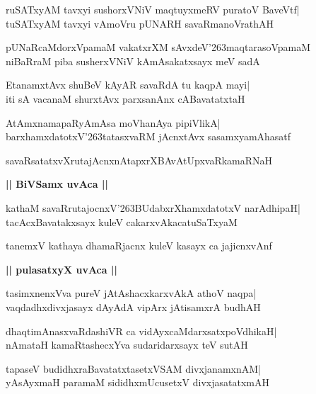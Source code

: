 \documentclass[twoside,12pt,openright]{book}
\def\S{\char'263}
\newcounter{shloka}[chapter]
\def\uvaca#1{\centerline{{\large\textbf{#1}}}}
\begin{document}
\begin{shloka}%
ruSATxyAM tavxyi sushorxVNiV maqtuyxmeRV puratoV BaveVtf|\\
tuSATxyAM tavxyi vAmoVru pUNARH savaRmanoVrathAH 
\end{shloka}

\begin{shloka}%
pUNaRcaMdorxVpamaM vakatxrXM sAvxdeV\S maqtarasoVpamaM\\
niBaRraM piba susherxVNiV kAmAsakatxsayx meV sadA
\end{shloka}

\begin{shloka}%
EtanamxtAvx shuBeV kAyAR savaRdA tu kaqpA mayi|\\
iti sA vacanaM shurxtAvx parxsanAnx cABavatatxtaH
\end{shloka}

\begin{shloka}%
AtAmxnamapaRyAmAsa moVhanAya pipiVlikA|\\
barxhamxdatotxV\S tatasxvaRM jAcnxtAvx sasamxyamAhasatf
\end{shloka}

\begin{shloka}%
savaRsatatxvXrutajAcnxnAtapxrXBAvAtUpxvaRkamaRNaH
\end{shloka}

\uvaca{|| BiVSamx uvAca ||}
\begin{shloka}%
kathaM savaRrutajocnxV\S BUdabxrXhamxdatotxV narAdhipaH|\\
tacAcxBavatakxsayx kuleV cakarxvAkacatuSaTxyaM
\end{shloka}

\begin{shloka}%
tanemxV kathaya dhamaRjacnx kuleV kasayx ca jajicnxvAnf
\end{shloka}

\uvaca{|| pulasatxyX uvAca ||}
\begin{shloka}%
tasimxnenxVva pureV jAtAshacxkarxvAkA athoV naqpa|\\
vaqdadhxdivxjasayx dAyAdA vipArx jAtisamxrA budhAH
\end{shloka}

\begin{shloka}%
dhaqtimAnasxvaRdashiVR ca vidAyxcaMdarxsatxpoVdhikaH|\\
nAmataH kamaRtashecxYva sudaridarxsayx teV sutAH
\end{shloka}

\begin{shloka}%
tapaseV budidhxraBavatatxtasetxVSAM divxjanamxnAM|\\
yAsAyxmaH paramaM sididhxmUcusetxV divxjasatatxmAH
\end{shloka}
\end{document}
